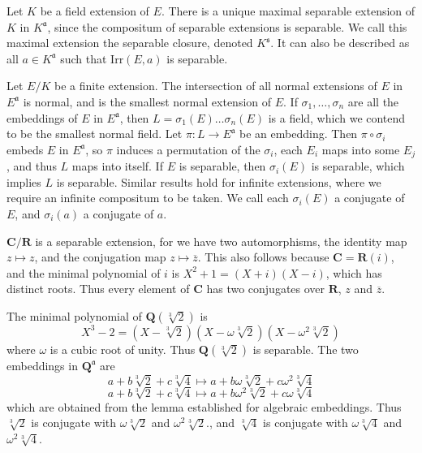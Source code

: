 \begin{example}
    Let $K$ be a field extension of $E$. There is a unique maximal separable extension of $K$ in $K^{\mathfrak{a}}$, since the compositum of separable extensions is separable. We call this maximal extension the separable closure, denoted $K^{\mathfrak{s}}$. It can also be described as all $a \in K^{\mathfrak{a}}$ such that $\text{Irr}(E,a)$ is separable.
\end{example}

Let $E/K$ be a finite extension. The intersection of all normal extensions of $E$ in $E^{\mathfrak{a}}$ is normal, and is the smallest normal extension of $E$. If $\sigma_1, \dots, \sigma_n$ are all the embeddings of $E$ in $E^{\mathfrak{a}}$, then $L = \sigma_1(E) \dots \sigma_n(E)$ is a field, which we contend to be the smallest normal field. Let $\pi: L \to E^{\mathfrak{a}}$ be an embedding. Then $\pi \circ \sigma_i$ embeds $E$ in $E^{\mathfrak{a}}$, so $\pi$ induces a permutation of the $\sigma_i$, each $E_i$ maps into some $E_j$, and thus $L$ maps into itself. If $E$ is separable, then $\sigma_i(E)$ is separable, which implies $L$ is separable. Similar results hold for infinite extensions, where we require an infinite compositum to be taken. We call each $\sigma_i(E)$ a conjugate of $E$, and $\sigma_i(a)$ a conjugate of $a$.

\begin{example}
    $\mathbf{C}/\mathbf{R}$ is a separable extension, for we have two automorphisms, the identity map $z \mapsto z$, and the conjugation map $z \mapsto \overline{z}$. This also follows because $\mathbf{C} = \mathbf{R}(i)$, and the minimal polynomial of $i$ is $X^2 + 1 = (X + i)(X - i)$, which has distinct roots. Thus every element of $\mathbf{C}$ has two conjugates over $\mathbf{R}$, $z$ and $\overline{z}$.
\end{example}

\begin{example}
    The minimal polynomial of $\mathbf{Q}(\sqrt[3]{2})$ is
    \[ X^3 - 2 = (X - \sqrt[3]{2})(X - \omega \sqrt[3]{2})(X - \omega^2 \sqrt[3]{2}) \]
    where $\omega$ is a cubic root of unity. Thus $\mathbf{Q}(\sqrt[3]{2})$ is separable. The two embeddings in $\mathbf{Q}^{\mathfrak{a}}$ are
    \[ a + b \sqrt[3]{2} + c \sqrt[3]{4} \mapsto a + b \omega \sqrt[3]{2} + c \omega^2 \sqrt[3]{4} \]
    \[ a + b \sqrt[3]{2} + c \sqrt[3]{4} \mapsto a + b \omega^2 \sqrt[3]{2} + c \omega \sqrt[3]{4} \]
    which are obtained from the lemma established for algebraic embeddings. Thus $\sqrt[3]{2}$ is conjugate with $\omega \sqrt[3]{2}$ and $\omega^2 \sqrt[3]{2}$., and $\sqrt[3]{4}$ is conjugate with $\omega \sqrt[3]{4}$ and $\omega^2 \sqrt[3]{4}$.
\end{example}


